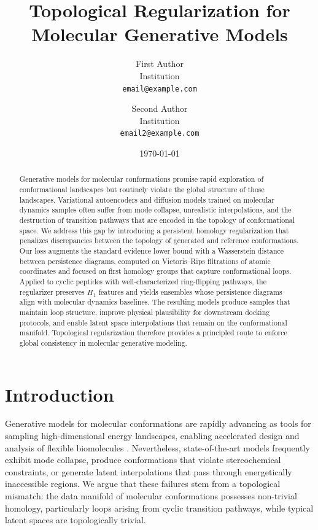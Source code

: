 \documentclass[11pt]{article}
\title{Topological Regularization for Molecular Generative Models}
\author{First Author\\Institution\\\texttt{email@example.com} \and Second Author\\Institution\\\texttt{email2@example.com}}
\date{\today}
\begin{document}
\maketitle

\begin{abstract}
Generative models for molecular conformations promise rapid exploration of conformational landscapes but routinely violate the global structure of those landscapes. Variational autoencoders and diffusion models trained on molecular dynamics samples often suffer from mode collapse, unrealistic interpolations, and the destruction of transition pathways that are encoded in the topology of conformational space. We address this gap by introducing a persistent homology regularization that penalizes discrepancies between the topology of generated and reference conformations. Our loss augments the standard evidence lower bound with a Wasserstein distance between persistence diagrams, computed on Vietoris--Rips filtrations of atomic coordinates and focused on first homology groups that capture conformational loops. Applied to cyclic peptides with well-characterized ring-flipping pathways, the regularizer preserves $H_1$ features and yields ensembles whose persistence diagrams align with molecular dynamics baselines. The resulting models produce samples that maintain loop structure, improve physical plausibility for downstream docking protocols, and enable latent space interpolations that remain on the conformational manifold. Topological regularization therefore provides a principled route to enforce global consistency in molecular generative modeling.
\end{abstract}

\section{Introduction}
Generative models for molecular conformations are rapidly advancing as tools for sampling high-dimensional energy landscapes, enabling accelerated design and analysis of flexible biomolecules \cite{noe2019boltzmann, trippe2023diffusion}. Nevertheless, state-of-the-art models frequently exhibit mode collapse, produce conformations that violate stereochemical constraints, or generate latent interpolations that pass through energetically inaccessible regions. We argue that these failures stem from a topological mismatch: the data manifold of molecular conformations possesses non-trivial homology, particularly loops arising from cyclic transition pathways, while typical latent spaces are topologically trivial.
\end{document}
